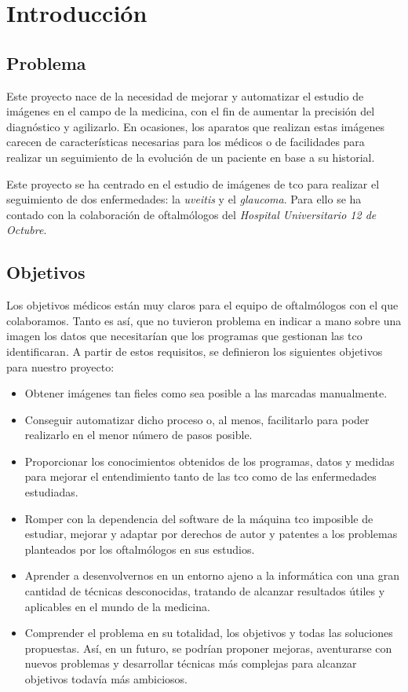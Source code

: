 \chapter{Introducción}
\section{Problema}
Este proyecto nace de la necesidad de mejorar y automatizar el estudio 
de imágenes en el campo de la medicina, con el fin de aumentar la precisión 
del diagnóstico y agilizarlo. En ocasiones, los aparatos que realizan 
estas imágenes carecen de características necesarias para los médicos 
o de facilidades para realizar un seguimiento de la evolución de un paciente 
en base a su historial. 

Este proyecto se ha centrado en el estudio de imágenes de \gls{tco}
para realizar el seguimiento de dos enfermedades: la \emph{\gls{uveitis}} y
el \emph{\gls{glaucoma}}. Para ello se ha contado con la colaboración de
oftalmólogos del \emph{Hospital Universitario 12 de Octubre}.

\section{Objetivos}
Los objetivos médicos están muy claros  para el equipo de oftalmólogos con el que colaboramos. Tanto es así, 
que no tuvieron problema en indicar a mano sobre una imagen los datos que 
necesitarían que los programas que gestionan las \gls{tco} identificaran. 
A partir de estos requisitos, se definieron los siguientes objetivos para nuestro proyecto:
\begin{itemize}
\item Obtener imágenes tan fieles como sea posible a las marcadas
  manualmente.
\item Conseguir automatizar dicho proceso o, al menos,
  facilitarlo para poder realizarlo en el menor número de pasos posible.
\item Proporcionar los conocimientos obtenidos de los programas, datos y
  medidas para mejorar el entendimiento tanto de las \gls{tco}
  como de las enfermedades estudiadas.
\item Romper con la dependencia del software de la máquina \gls{tco}
  imposible de estudiar, mejorar y adaptar por derechos de autor y
  patentes a los problemas planteados por los oftalmólogos en sus
  estudios.
\item Aprender a desenvolvernos en un entorno ajeno a la informática
  con una gran cantidad de técnicas desconocidas, tratando de alcanzar
  resultados útiles y aplicables en el mundo de la medicina.
\item Comprender el problema en su totalidad, los objetivos y todas
  las soluciones propuestas. Así, en un futuro, se podrían proponer
  mejoras, aventurarse con nuevos problemas y desarrollar técnicas más
  complejas para alcanzar objetivos todavía más ambiciosos.
\end{itemize}

